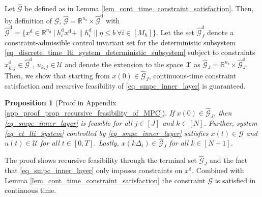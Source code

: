 \documentclass{IEEEtran}
\newtheorem{proposition}[theorem]{Proposition}
\newtheorem{assumption}{Assumption}
\begin{document}
Let $\hat{\mathcal{G}}$ be defined as in Lemma \ref{lem_cont_time_constraint_satisfaction}. Then, by definition of $\mathcal{G}$, $\hat{\mathcal{G}}=\mathbb{R}^{n_{\text{s}}}\times \hat{\mathcal{G}}^{\text{d}}$ with $\hat{\mathcal{G}}^{\text{d}}=\{x^{\text{d}}\in\mathbb{R}^{n_{\text{d}}}\ | \ h_i^{\text{d}}x^{\text{d}}+\|h_i^{\text{d}}\|\eta\leq b \ \forall i\in[M_h]\}$. Let the set $\hat{\mathcal{G}}_J^{\text{d}}$ denote a constraint-admissible control invariant set for the deterministic subsystem \eqref{eq_discrete_time_lti_system_deterministic_subsystem} subject to constraints $x_{k,j}^{\text{d}}\in\hat{\mathcal{G}}^{\text{d}}$, $u_{k,j}\in\mathcal{U}$ and denote the extension to the space $\mathcal{X}$ as $\hat{\mathcal{G}}_J=\mathbb{R}^{n_{\text{s}}}\times \hat{\mathcal{G}}_J^{\text{d}}$. Then, we show that starting from $x(0)\in\hat{\mathcal{G}}_J$, continuous-time constraint satisfaction and recursive feasibility of \eqref{eq_smpc_inner_layer} is guaranteed.
\begin{proposition}
    [Proof in Appendix \ref{app_proof_prop_recursive_feasibility_of_MPC}]\label{prop_recursive_feasibility_of_MPC}
    If $x(0)\in\hat{\mathcal{G}}_J$, then \eqref{eq_smpc_inner_layer} is feasible for all $j\in[J]$ and $k\in[N]$. Further, system \eqref{eq_ct_lti_system} controlled by \eqref{eq_smpc_inner_layer} satisfies ${x}(t)\in{\mathcal{G}}$ and $u(t)\in\mathcal{U}$ for all $t\in [0, T]$. Lastly, ${x}(k\Delta_t)\in\hat{\mathcal{G}}_J$ for all $k\in [N+1]$. %
\end{proposition}
The proof shows recursive feasibility through the terminal set $\hat{\mathcal{G}}_J$ and the fact that \eqref{eq_smpc_inner_layer} only imposes constraints on $x^{\text{d}}$. Combined with Lemma \ref{lem_cont_time_constraint_satisfaction} the constraint $\mathcal{G}$ is satisfied in continuous time.  


\end{document}
